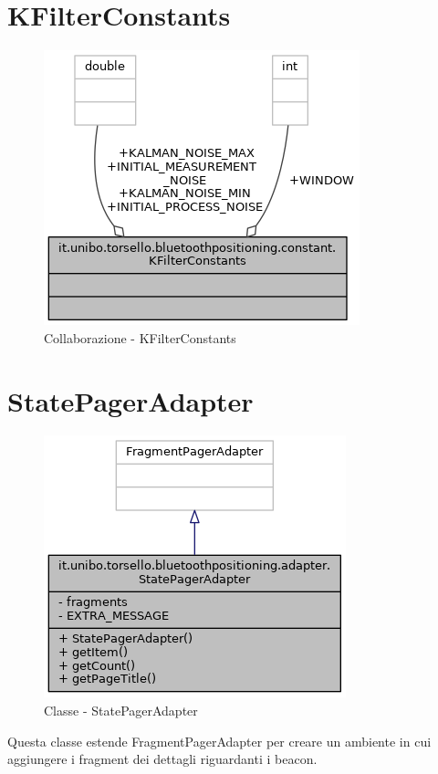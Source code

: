 \newpage
\section{KFilterConstants}
\begin{figure}[ph]
	\centering
	\includegraphics[width=0.6\linewidth]{img/uml/class/classit_1_1unibo_1_1torsello_1_1bluetoothpositioning_1_1constant_1_1KFilterConstants__coll__graph.png}
	\caption{Collaborazione - KFilterConstants}
\end{figure}

\newpage
\section{StatePagerAdapter}
\begin{figure}[ph]
	\centering
	\includegraphics[width=0.5\linewidth]{img/uml/class/classit_1_1unibo_1_1torsello_1_1bluetoothpositioning_1_1adapter_1_1StatePagerAdapter__inherit__graph.png}
	\caption{Classe - StatePagerAdapter}
\end{figure}

Questa classe estende FragmentPagerAdapter per creare un ambiente in cui aggiungere i fragment dei dettagli riguardanti i beacon.

